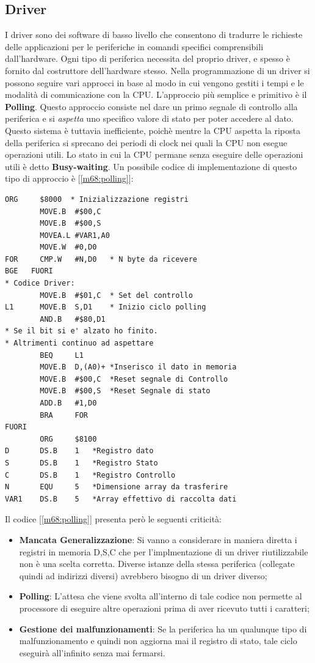 \subsection{Driver}
I driver sono dei software di basso livello che consentono di tradurre le richieste delle applicazioni per le periferiche in comandi specifici comprensibili dall'hardware. Ogni tipo di periferica necessita del proprio driver, e spesso è fornito dal costruttore dell'hardware stesso. 
Nella programmazione di un driver si possono seguire vari approcci in base al modo in cui vengono gestiti i tempi e le modalità di comunicazione con la CPU. L'approccio più semplice e primitivo è il \textbf{Polling}. Questo approccio consiste nel dare un primo segnale di controllo alla periferica e si \textit{aspetta} uno specifico valore di stato per poter accedere al dato. Questo sistema è tuttavia inefficiente, poichè mentre la CPU aspetta la riposta della periferica si sprecano dei periodi di clock nei quali la CPU non esegue operazioni utili. Lo stato in cui la CPU permane senza eseguire delle operazioni utili è detto \textbf{Busy-waiting}. Un possibile codice di implementazione di questo tipo di approccio è [\ref{m68:polling}]:

\begin{lstlisting}[caption={Codice polling}, label=m68:polling]
        ORG     $8000  * Inizializzazione registri
        MOVE.B  #$00,C
        MOVE.B  #$00,S
        MOVEA.L #VAR1,A0
        MOVE.W  #0,D0
FOR     CMP.W   #N,D0   * N byte da ricevere
BGE   FUORI
* Codice Driver:
        MOVE.B  #$01,C  * Set del controllo
L1      MOVE.B  S,D1    * Inizio ciclo polling
        AND.B   #$80,D1  
* Se il bit si e' alzato ho finito. 
* Altrimenti continuo ad aspettare
        BEQ     L1
        MOVE.B  D,(A0)+ *Inserisco il dato in memoria
        MOVE.B  #$00,C  *Reset segnale di Controllo
        MOVE.B  #$00,S  *Reset Segnale di stato 
        ADD.B   #1,D0             
        BRA     FOR
FUORI
        ORG     $8100
D       DS.B    1   *Registro dato
S       DS.B    1   *Registro Stato
C       DS.B    1   *Registro Controllo
N       EQU     5   *Dimensione array da trasferire
VAR1    DS.B    5   *Array effettivo di raccolta dati
\end{lstlisting}

Il codice [\ref{m68:polling}] presenta però le seguenti criticità:
\begin{itemize}
    \item \textbf{Mancata Generalizzazione}: Si vanno a considerare in maniera diretta i registri in memoria D,S,C che per l'implmentazione di un driver riutilizzabile non è una scelta corretta. Diverse istanze della stessa periferica (collegate quindi ad indirizzi diversi) avrebbero bisogno di un driver diverso;
    \item \textbf{Polling}: L'attesa che viene svolta all'interno di tale codice non permette al processore di eseguire altre operazioni prima di aver ricevuto tutti i caratteri;
    \item \textbf{Gestione dei malfunzionamenti}: Se la periferica ha un qualunque tipo di malfunzionamento e quindi non aggiorna mai il registro di stato, tale ciclo eseguirà all'infinito senza mai fermarsi.
\end{itemize}

